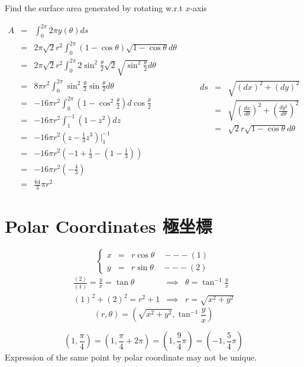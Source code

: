 \begin{eg}
Find the surface area generated by rotating w.r.t \(x\)-axis

\soln
\[\begin{array}{rcl}
A & = & \displaystyle \int^{2\pi}_0 2\pi y(\theta) ds\\
& = & \displaystyle 2\pi \sqrt{2} r^2 \int^{2\pi}_0 (1 - \cos \theta) \sqrt{1 - \cos \theta} d\theta\\
& = & \displaystyle 2\pi \sqrt{2} r^2 \int^{2\pi}_0 2 \sin^2 \frac{\theta}{2} \sqrt{2} \sqrt{\sin^2 \frac{\theta}{2}} d\theta\\
& = & \displaystyle 8\pi r^2 \int^{2\pi}_0 \sin^2 \frac{\theta}{2} \sin \frac{\theta}{2} d\theta\\
& = & \displaystyle -16\pi r^2 \int^{2\pi}_0 (1 - \cos^2 \frac{\theta}{2}) d\cos \frac{\theta}{2}\\
& = & \displaystyle -16\pi r^2 \int^{-1}_1 (1 - z^2) dz\\
& = & \displaystyle -16\pi r^2 (z - \frac{1}{3} z^3) \Big|^{-1}_1\\
& = & \displaystyle -16\pi r^2 (-1 + \frac{1}{3} - (1 - \frac{1}{3}))\\
& = & \displaystyle -16\pi r^2 (-\frac{4}{3})\\
& = & \displaystyle \frac{64}{3} \pi r^2
\end{array} \quad \quad \begin{array}{rcl}
ds & = & \displaystyle \sqrt{(dx)^2 + (dy)^2}\\
& = & \displaystyle \sqrt{(\frac{dx}{d\theta})^2 + (\frac{dy^2}{d\theta})^2}\\
& = & \displaystyle \sqrt{2} r \sqrt{1 - \cos \theta} d\theta
\end{array}\]
\end{eg}
\section{Polar Coordinates 極坐標}
\begin{defn}
\[\left\{\begin{array}{rcl}
x & = & r \cos \theta \quad ---(1)\\
y & = & r \sin \theta \quad ---(2)
\end{array}\right.\]
\[\begin{array}{rcl}
\displaystyle \frac{(2)}{(1)} = \frac{y}{x} = \tan \theta & \implies & \displaystyle \theta = \tan^{-1} \frac{y}{x}\\
(1)^2 + (2)^2 = r^2 + 1 & \implies & r = \sqrt{x^2 + y^2}
\end{array}\]
\[(r, \theta) = (\sqrt{x^2 + y^2}, \tan^{-1} \frac{y}{x})\]
\end{defn}
\begin{notn}
\[\displaystyle (1, \frac{\pi}{4}) = (1, \frac{\pi}{4} + 2\pi) = (1, \frac{9}{4}\pi) = (-1, \frac{5}{4}\pi)\]
Expression of the same point by polar coordinate may not be unique.
\end{notn}
